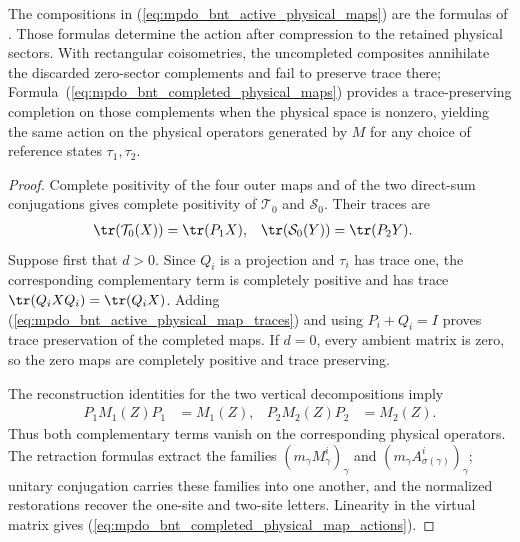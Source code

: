 \begin{lemma}
    The compositions in
    (\ref{eq:mpdo_bnt_active_physical_maps}) are the formulas of
    \cite[Appendix~C.4, lines~2065--2085]{Cirac2016MPDO_arXiv}.  Those formulas
    determine the action after compression to the retained physical sectors.
    With rectangular coisometries, the uncompleted composites annihilate the
    discarded zero-sector complements and fail to preserve trace there;
    Formula~(\ref{eq:mpdo_bnt_completed_physical_maps}) provides a
    trace-preserving completion on those complements when the physical space is
    nonzero, yielding the same action on the physical operators generated by $M$
    for any choice of reference states $\tau_1,\tau_2$.
\end{lemma}

\begin{proof}\leanok
    Complete positivity of the four outer maps and of the two direct-sum
    conjugations gives complete positivity of $\mathcal T_0$ and
    $\mathcal S_0$.  Their traces are
    \begin{align}
        \tr(\mathcal T_0(X)) & =\tr(P_1X),
                             &
        \tr(\mathcal S_0(Y)) & =\tr(P_2Y).
        \label{eq:mpdo_bnt_active_physical_map_traces}
    \end{align}
    Suppose first that $d>0$.  Since $Q_i$ is a projection and $\tau_i$ has
    trace one, the corresponding complementary term is completely positive
    and has trace $\tr(Q_iXQ_i)=\tr(Q_iX)$.  Adding
    (\ref{eq:mpdo_bnt_active_physical_map_traces}) and using $P_i+Q_i=I$
    proves trace preservation of the completed maps.  If $d=0$, every ambient
    matrix is zero, so the zero maps are completely positive and trace
    preserving.

    The reconstruction identities for the two vertical decompositions imply
    \begin{align}
        P_1M_1(Z)P_1 & =M_1(Z),
                     &
        P_2M_2(Z)P_2 & =M_2(Z).
        \label{eq:mpdo_bnt_physical_closure_support}
    \end{align}
    Thus both complementary terms vanish on the corresponding physical
    operators.  The retraction formulas extract the families
    $(m_\gamma M_\gamma^i)_\gamma$ and
    $(m_\gamma A_{\sigma(\gamma)}^i)_\gamma$; unitary conjugation carries
    these families into one another, and the normalized restorations recover
    the one-site and two-site letters.  Linearity in the virtual matrix gives
    (\ref{eq:mpdo_bnt_completed_physical_map_actions}).
\end{proof}

